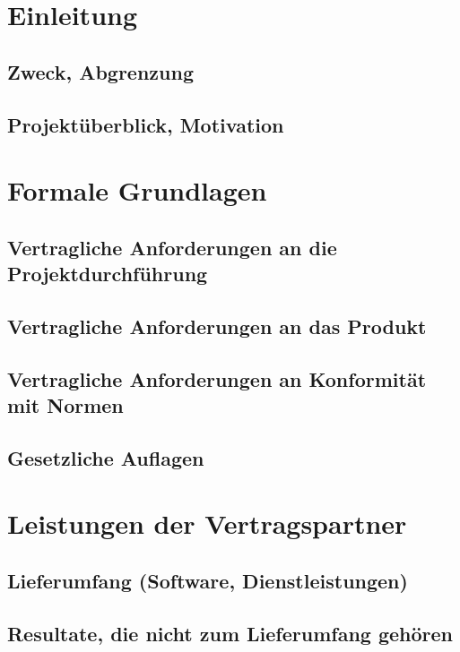 \documentclass[a4paper,10pt]{scrartcl}
\author{}
\date{}
\title{}
\begin{document}
\maketitle
\newpage
\tableofcontents
\newpage


\section{Einleitung}
\subsection{Zweck, Abgrenzung}
\subsection{Projektüberblick, Motivation}




\section{Formale Grundlagen}
\subsection{Vertragliche Anforderungen an die Projektdurchführung}
\subsection{Vertragliche Anforderungen an das Produkt}
\subsection{Vertragliche Anforderungen an Konformität mit Normen}
\subsection{Gesetzliche Auflagen}



\section{Leistungen der Vertragspartner}
\subsection{Lieferumfang (Software, Dienstleistungen)}
\subsection{Resultate, die nicht zum Lieferumfang gehören}
\end{document}
